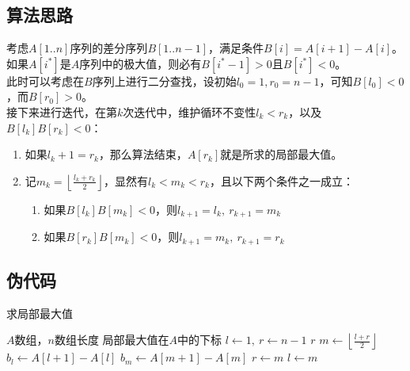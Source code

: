 \documentclass[UTF8]{ctexart}
\begin{document}
\subsection*{算法思路}
考虑$A[1..n]$序列的差分序列$B[1..n-1]$，满足条件$B[i] = A[i+1] - A[i]$。 \\
如果$A[i^*]$是$A$序列中的极大值，则必有$B[i^*-1] > 0$且$B[i^*] < 0$。 \\
此时可以考虑在$B$序列上进行二分查找，设初始$l_0=1, r_0=n-1$，可知$B[l_0]<0$，而$B[r_0]>0$。 \\
接下来进行迭代，在第$k$次迭代中，维护循环不变性$l_k < r_k$，以及$B[l_k]B[r_k] < 0$：
\begin{enumerate}
    \item 如果$l_k+1=r_k$，那么算法结束，$A[r_k]$就是所求的局部最大值。
    \item 记$m_k = \left\lfloor\frac{l_k+r_k}{2}\right\rfloor$，显然有$l_k < m_k < r_k$，且以下两个条件之一成立：
        \begin{enumerate}
            \item 如果$B[l_k]B[m_k] < 0$，则$l_{k+1} = l_k,\ r_{k+1} = m_k$
            \item 如果$B[r_k]B[m_k] < 0$，则$l_{k+1} = m_k,\ r_{k+1} = r_k$
        \end{enumerate}
\end{enumerate}

\subsection*{伪代码}
\begin{algorithm}
    \caption{求局部最大值}
    \begin{algorithmic}[1]
        \Require $A$数组，$n$数组长度
        \Ensure 局部最大值在$A$中的下标
            \State $l\gets 1,\ r\gets n-1$
                    \State \Return $r$
                \Else
                    \State $m\gets \left\lfloor\frac{l+r}{2}\right\rfloor$
                    \State $b_l \gets A[l+1]-A[l]$
                    \State $b_m \gets A[m+1]-A[m]$
                        \State $r \gets m$
                    \Else
                        \State $l \gets m$
                    \EndIf
                \EndIf
            \EndWhile
        \EndFunction
    \end{algorithmic}
\end{algorithm}
\end{document}

